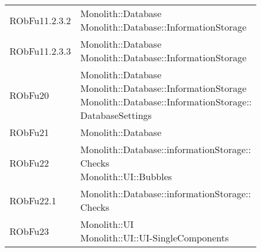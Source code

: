 \begin{center}
\begin{longtable}{|
*{1}{>{\centering\arraybackslash}m{2.5cm}|}
*{1}{>{\centering\arraybackslash}m{7.5cm}|}}
{\\}\\\hline
RObFu11.2.3.2 & \makecell[l]{Monolith::Database
\\Monolith::Database::InformationStorage
\\}\\\hline
RObFu11.2.3.3 & \makecell[l]{Monolith::Database
\\Monolith::Database::InformationStorage
\\}\\\hline
RObFu20 & \makecell[l]{Monolith::Database
\\Monolith::Database::InformationStorage
\\Monolith::Database::InformationStorage:: \\ \hfill DatabaseSettings
\\}\\\hline
RObFu21 & \makecell[l]{Monolith::Database
\\}\\\hline
RObFu22 & \makecell[l]{Monolith::Database::informationStorage:: \\ \hfill Checks
\\Monolith::UI::Bubbles
\\}\\\hline
RObFu22.1 & \makecell[l]{Monolith::Database::informationStorage:: \\ \hfill Checks
\\}\\\hline
RObFu23 & \makecell[l]{Monolith::UI
\\Monolith::UI::UI-SingleComponents
\\}\\\hline
\end{longtable}
\end{center}
